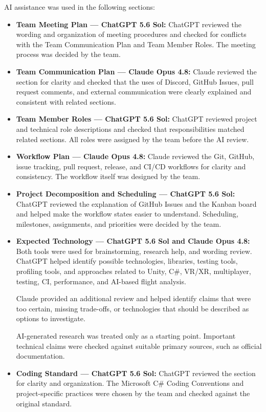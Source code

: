 \documentclass{article}
\begin{document}
AI assistance was used in the following sections:

\begin{itemize}

    \item \textbf{Team Meeting Plan --- ChatGPT 5.6 Sol:}
    ChatGPT reviewed the wording and organization of meeting procedures and checked for
    conflicts with the Team Communication Plan and Team Member Roles. The meeting process
    was decided by the team.

    \item \textbf{Team Communication Plan --- Claude Opus 4.8:}
    Claude reviewed the section for clarity and checked that the uses of Discord, GitHub
    Issues, pull request comments, and external communication were clearly explained and
    consistent with related sections.

    \item \textbf{Team Member Roles --- ChatGPT 5.6 Sol:}
    ChatGPT reviewed project and technical role descriptions and checked that responsibilities
    matched related sections. All roles were assigned by the team before the AI review.

    \item \textbf{Workflow Plan --- Claude Opus 4.8:}
    Claude reviewed the Git, GitHub, issue tracking, pull request, release, and CI/CD
    workflows for clarity and consistency. The workflow itself was designed by the team.

    \item \textbf{Project Decomposition and Scheduling --- ChatGPT 5.6 Sol:}
    ChatGPT reviewed the explanation of GitHub Issues and the Kanban board and helped make
    the workflow states easier to understand. Scheduling, milestones, assignments, and
    priorities were decided by the team.

    \item \textbf{Expected Technology --- ChatGPT 5.6 Sol and Claude Opus 4.8:}
    Both tools were used for brainstorming, research help, and wording review. ChatGPT helped
    identify possible technologies, libraries, testing tools, profiling tools, and approaches
    related to Unity, C\#, VR/XR, multiplayer, testing, CI, performance, and AI-based flight
    analysis.

    Claude provided an additional review and helped identify claims that were too certain,
    missing trade-offs, or technologies that should be described as options to investigate.

    AI-generated research was treated only as a starting point. Important technical claims
    were checked against suitable primary sources, such as official documentation.

    \item \textbf{Coding Standard --- ChatGPT 5.6 Sol:}
    ChatGPT reviewed the section for clarity and organization. The Microsoft C\# Coding
    Conventions and project-specific practices were chosen by the team and checked against
    the original standard.

\end{itemize}
\end{document}
